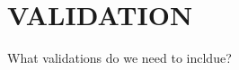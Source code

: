 \documentclass[
  journal=pasa,
  manuscript=research-paper, %
  year=2021,
  volume=37
]{cup-journal}
\newcommand{\SB}[1]{{\textcolor{purple}{#1}}}
\newcommand{\Teff}{$T_\mathrm{eff}$\xspace}
\newcommand{\logg}{$\log g$\xspace}
\newcommand{\vsini}{$v \sin i$\xspace}
\newcommand{\TheCannon}{\textit{The Cannon}\xspace}
\newcommand{\dex}{\,\mathrm{dex}}	%
\newcommand{\K}{\,\mathrm{K}}	%
\newcommand{\kms}{\,\mathrm{km\,s^{-1}}}	%
\begin{document}



\newpage
\section{VALIDATION}
\label{sec:validation}



What validations do we need to incldue?
\end{document}
